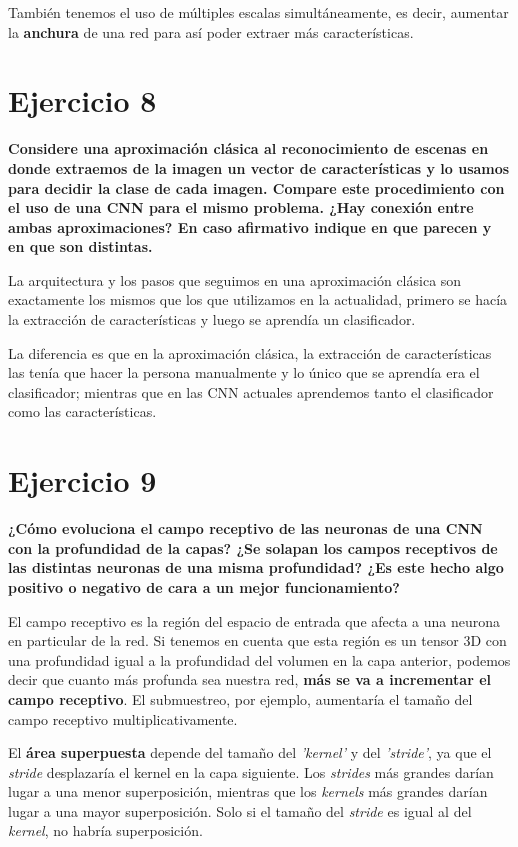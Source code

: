 \documentclass[11pt,a4paper]{article}
\begin{document}
También tenemos el uso de múltiples escalas simultáneamente, es decir, aumentar la \textbf{anchura} de una red para así poder extraer más características.



\section*{Ejercicio 8}

\textbf{Considere una aproximación clásica al reconocimiento de escenas en donde extraemos de la imagen un vector de características y lo usamos para decidir la
clase de cada imagen. Compare este procedimiento con el uso de una CNN para el mismo problema. ¿Hay conexión entre ambas aproximaciones? En caso afirmativo indique
en que parecen y en que son distintas.}

La arquitectura y los pasos que seguimos en una aproximación clásica son exactamente los mismos que los que utilizamos en la actualidad, primero se hacía la
extracción de características y luego se aprendía un clasificador.

La diferencia es que en la aproximación clásica, la extracción de características las tenía que hacer la persona manualmente y lo único que se aprendía era el
clasificador; mientras que en las CNN actuales aprendemos tanto el clasificador como las características.


\section*{Ejercicio 9}

\textbf{¿Cómo evoluciona el campo receptivo de las neuronas de una CNN con la profundidad de la capas? ¿Se solapan los campos receptivos de las distintas neuronas de
una misma profundidad? ¿Es este hecho algo positivo o negativo de cara a un mejor funcionamiento?}

El campo receptivo es la región del espacio de entrada que afecta a una neurona en particular de la red. Si tenemos en cuenta que esta región es un tensor 3D con una
profundidad igual a la profundidad del volumen en la capa anterior, podemos decir que cuanto más profunda sea nuestra red, \textbf{más se va a incrementar el campo
receptivo}. El submuestreo, por ejemplo, aumentaría el tamaño del campo receptivo multiplicativamente.

El \textbf{área superpuesta} depende del tamaño del \textit{'kernel'} y del \textit{'stride'}, ya que el \textit{stride} desplazaría el kernel en la capa siguiente.
Los \textit{strides} más grandes darían lugar a una menor superposición, mientras que los \textit{kernels} más grandes darían lugar a una mayor superposición. Solo si
el tamaño del \textit{stride} es igual al del \textit{kernel}, no habría superposición.
\end{document}
